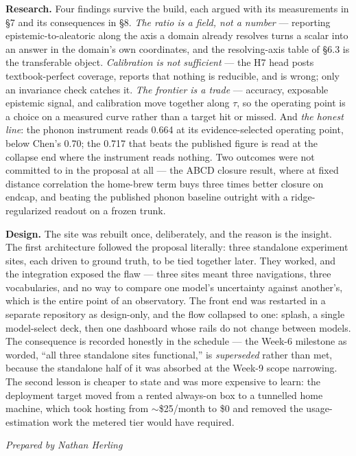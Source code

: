 \documentclass[11pt]{article}
\newcommand{\preparedby}{%
  \par\nobreak\vspace{-6pt}%
  {\footnotesize\itshape\color{forgemute}Prepared by Nathan Herling}%
  \par\vspace{4pt}}
\begin{document}
\textbf{Research.} Four findings survive the build, each argued with its
measurements in \S7 and its consequences in \S8. \emph{The ratio is a field, not
a number} --- reporting epistemic-to-aleatoric along the axis a domain already
resolves turns a scalar into an answer in the domain's own coordinates, and the
resolving-axis table of \S6.3 is the transferable object. \emph{Calibration is
not sufficient} --- the H7 head posts textbook-perfect coverage, reports that
nothing is reducible, and is wrong; only an invariance check catches it.
\emph{The frontier is a trade} --- accuracy, exposable epistemic signal, and
calibration move together along $\tau$, so the operating point is a choice on a
measured curve rather than a target hit or missed. And \emph{the honest line}:
the phonon instrument reads 0.664 at its evidence-selected operating point,
below Chen's 0.70; the 0.717 that beats the published figure is read at the
collapse end where the instrument reads nothing. Two outcomes were not committed
to in the proposal at all --- the ABCD closure result, where at fixed distance
correlation the home-brew term buys three times better closure on endcap, and
beating the published phonon baseline outright with a ridge-regularized readout
on a frozen trunk.

\textbf{Design.} The site was rebuilt once, deliberately, and the reason is the
insight. The first architecture followed the proposal literally: three
standalone experiment sites, each driven to ground truth, to be tied together
later. They worked, and the integration exposed the flaw --- three sites meant
three navigations, three vocabularies, and no way to compare one model's
uncertainty against another's, which is the entire point of an observatory. The
front end was restarted in a separate repository as design-only, and the flow
collapsed to one: splash, a single model-select deck, then one dashboard whose
rails do not change between models. The consequence is recorded honestly in the
schedule --- the Week-6 milestone as worded, ``all three standalone sites
functional,'' is \emph{superseded} rather than met, because the standalone half
of it was absorbed at the Week-9 scope narrowing. The second lesson is cheaper
to state and was more expensive to learn: the deployment target moved from a
rented always-on box to a tunnelled home machine, which took hosting from
$\sim$\$25/month to \$0 and removed the usage-estimation work the metered tier
would have required.


\preparedby
\newsection
\end{document}
